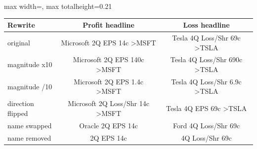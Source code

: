 \begin{table}[htbp]
{\begin{adjustbox}{max width=\linewidth, max totalheight=0.21\textheight}
\begin{tabular}{lcc}
\toprule
Rewrite & Profit headline & Loss headline \\
\midrule
original & Microsoft 2Q EPS 14c \textgreater{}MSFT & Tesla 4Q Loss/Shr 69c \textgreater{}TSLA \\
magnitude x10 & Microsoft 2Q EPS 140c \textgreater{}MSFT & Tesla 4Q Loss/Shr 690c \textgreater{}TSLA \\
magnitude /10 & Microsoft 2Q EPS 1.4c \textgreater{}MSFT & Tesla 4Q Loss/Shr 6.9c \textgreater{}TSLA \\
direction flipped & Microsoft 2Q Loss/Shr 14c \textgreater{}MSFT & Tesla 4Q EPS 69c \textgreater{}TSLA \\
name swapped & Oracle 2Q EPS 14c & Ford 4Q Loss/Shr 69c \\
name removed & 2Q EPS 14c & 4Q Loss/Shr 69c \\
\bottomrule
\end{tabular}
\end{adjustbox}
}
\end{table}
